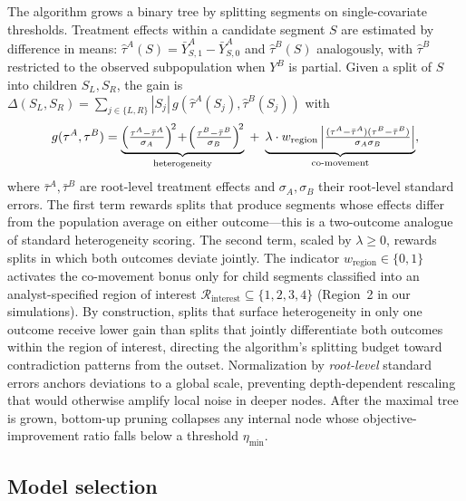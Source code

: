 \documentclass[12pt,a4paper]{article}
\begin{document}
The algorithm grows a binary tree by splitting segments on single-covariate thresholds. Treatment effects within a candidate segment $S$ are estimated by difference in means: $\hat\tau^A(S)=\bar Y^A_{S,1}-\bar Y^A_{S,0}$ and $\hat\tau^B(S)$ analogously, with $\hat\tau^B$ restricted to the observed subpopulation when $Y^B$ is partial. Given a split of $S$ into children $S_L,S_R$, the gain is $\Delta(S_L,S_R)=\sum_{j\in\{L,R\}}|S_j|\,g(\hat\tau^A(S_j),\hat\tau^B(S_j))$ with
%
\begin{equation}
g(\tau^A,\tau^B)
=
\underbrace{\Bigl(\tfrac{\tau^A-\bar\tau^A}{\sigma_A}\Bigr)^{\!2}
\!+\!\Bigl(\tfrac{\tau^B-\bar\tau^B}{\sigma_B}\Bigr)^{\!2}}_{\text{heterogeneity}}
\;+\;
\underbrace{\lambda\cdot w_{\text{region}}
\left|\tfrac{(\tau^A-\bar\tau^A)(\tau^B-\bar\tau^B)}{\sigma_A\sigma_B}\right|}_{\text{co-movement}},
\label{eq:objective}
\end{equation}
%
where $\bar\tau^A,\bar\tau^B$ are root-level treatment effects and $\sigma_A,\sigma_B$ their root-level standard errors. The first term rewards splits that produce segments whose effects differ from the population average on either outcome---this is a two-outcome analogue of standard heterogeneity scoring. The second term, scaled by $\lambda\ge 0$, rewards splits in which both outcomes deviate jointly. The indicator $w_{\text{region}}\in\{0,1\}$ activates the co-movement bonus only for child segments classified into an analyst-specified region of interest $\mathcal{R}_{\text{interest}}\subseteq\{1,2,3,4\}$ (Region~2 in our simulations). By construction, splits that surface heterogeneity in only one outcome receive lower gain than splits that jointly differentiate both outcomes within the region of interest, directing the algorithm's splitting budget toward contradiction patterns from the outset. Normalization by \emph{root-level} standard errors anchors deviations to a global scale, preventing depth-dependent rescaling that would otherwise amplify local noise in deeper nodes. After the maximal tree is grown, bottom-up pruning collapses any internal node whose objective-improvement ratio falls below a threshold $\eta_{\min}$.

\subsection{Model selection}
\label{sec:model_selection}
\end{document}
